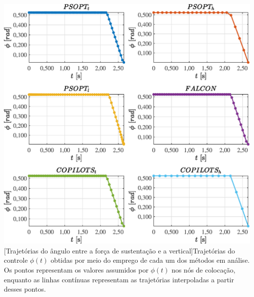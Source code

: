 \noindent
\begin{minipage}{\textwidth}
	\vspace{\onelineskip}
	\centering
	\includegraphics[scale=0.7]{fig/resultados/uav/traj/u/phi}
	[Trajetórias do ângulo entre a força de sustentação e a vertical]{Trajetórias do controle $ \phi(t) $ obtidas por meio do emprego de cada um dos métodos em análise. Os pontos representam os valores assumidos por $ \phi(t) $ nos nós de colocação, enquanto as linhas contínuas representam as trajetórias interpoladas a partir desses pontos.}
	\label{fig:uav:u:phi}
	\vspace{\onelineskip}
\end{minipage}

